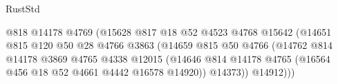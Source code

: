 \begin{lexlean}{RustStd}
\begin{coremodule}
                                                  @818
                                                  @14178
                                                  @4769
                                                  (@15628
                                                    @817
                                                    @18
                                                    @52
                                                    @4523
                                                    @4768
                                                    @15642
                                                    (@14651
                                                      @815
                                                      @120
                                                      @50
                                                      @28
                                                      @4766
                                                      @3863
                                                      (@14659
                                                        @815
                                                        @50
                                                        @4766
                                                        (@14762
                                                          @814
                                                          @14178
                                                          @3869
                                                          @4765
                                                          @4338
                                                          @12015
                                                          (@14646
                                                            @814
                                                            @14178
                                                            @4765
                                                            (@16564
                                                              @456
                                                              @18
                                                              @52
                                                              @4661
                                                              @4442
                                                              @16578
                                                              @14920))
                                                          @14373))
                                                      @14912)))

\end{coremodule}
\end{lexlean}
